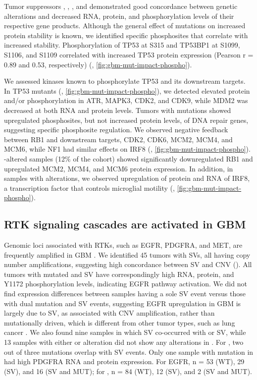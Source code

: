 Tumor suppressors , , , and  demonstrated good concordance between genetic alterations and decreased RNA, protein, and phosphorylation levels of their respective gene products. Although the general effect of  mutations on increased protein stability is known, we identified specific phosphosites that correlate with increased stability. Phosphorylation of TP53 at S315 and TP53BP1 at S1099, S1106, and S1109 correlated with increased TP53 protein expression (Pearson r = 0.89 and 0.53, respectively) (, \ref{fig:gbm-mut-impact-phospho}).

We assessed kinases known to phosphorylate TP53 and its downstream targets. In TP53 mutants (, \ref{fig:gbm-mut-impact-phospho}), we detected elevated protein and/or phosphorylation in ATR, MAPK3, CDK2, and CDK9, while MDM2 was decreased at both RNA and protein levels. Tumors with  mutations showed upregulated phosphosites, but not increased protein levels, of DNA repair genes, suggesting specific phosphosite regulation. We observed negative feedback between RB1 and downstream targets, CDK2, CDK6, MCM2, MCM4, and MCM6, while NF1 had similar effects on IRF8 (, \ref{fig:gbm-mut-impact-phospho}). -altered samples (12\% of the cohort) showed significantly downregulated RB1 and upregulated MCM2, MCM4, and MCM6 protein expression. In addition, in samples with  alterations, we observed upregulation of protein and RNA of IRF8, a transcription factor that controls microglial motility \cite{masudat_inouek:IRF8Transcriptional2014} (, \ref{fig:gbm-mut-impact-phospho}).


\subsection{RTK signaling cascades are activated in GBM}
Genomic loci associated with RTKs, such as EGFR, PDGFRA, and MET, are frequently amplified in GBM \cite{brennancw_chinl:GBM2013}. We identified 45 tumors with  SVs, all having copy number amplifications, suggesting high concordance between SV and CNV (). All tumors with mutated  and SV have correspondingly high RNA, protein, and Y1172 phosphorylation levels, indicating EGFR pathway activation. We did not find expression differences between samples having a sole SV event versus those with dual mutation and SV events, suggesting EGFR upregulation in GBM is largely due to SV, as associated with CNV amplification, rather than mutationally driven, which is different from other tumor types, such as lung cancer \cite{tcga:LUAD2014}. We also found nine samples in which  SV co-occurred with  or  SV, while 13 samples with either  or  alteration did not show any alterations in . For , two out of three mutations overlap with SV events. Only one sample with mutation in  had high PDGFRA RNA and protein expression. For EGFR, n = 53 (WT), 29 (SV), and 16 (SV and MUT); for , n = 84 (WT), 12 (SV), and 2 (SV and MUT).


